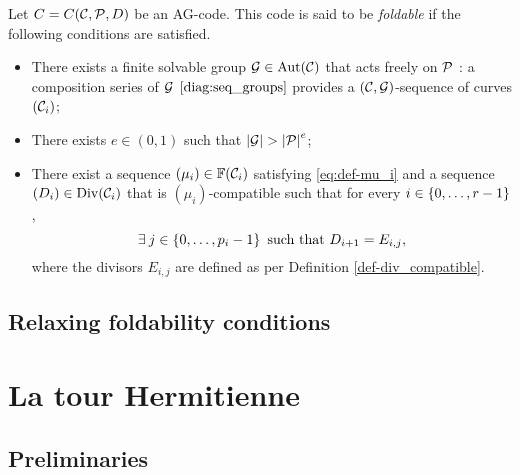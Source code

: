 \documentclass[10pt]{article}
\begin{document}
\begin{definition}\label{def:good_properties}
	Let $C =C(\mathcal{C},\mathcal{P},D)$ be an AG-code. This code is said to be \emph{foldable} if the following conditions are satisfied.
	\begin{itemize}
		\item There exists a finite solvable group $\mathcal{G} \in \operatorname{Aut}(\mathcal{C})$ that acts freely on $\mathcal{P}$ : a composition series of $\mathcal{G}$ $\eqref{diag:seq_groups}$ provides a $(\mathcal{C},\mathcal{G})$-sequence of curves $(\mathcal{C}_i)$;
		\item There exists $e \in (0,1)$ such that $\left|\mathcal{G}\right| > \left|\mathcal{P}\right|^e$;
		\item There exist a sequence $(\mu_i) \in \mathbb{F}(\mathcal{C}_i)$ satisfying \eqref{eq:def-mu_i} and a sequence $(D_i) \in \operatorname{Div}(\mathcal{C}_i)$ that is $(\mu_i)$-compatible such that for every $i \in \left\{0,\dots,r-1\right\}$,
		\begin{equation}\label{eq:cdt_Di+1}
			\exists \: j \in \left\{0,\dots,p_i-1\right\} \text{ such that } D_{i+1}=E_{i,j},
		\end{equation}
		where the divisors $E_{i, j}$ are defined as per Definition \ref{def-div_compatible}.
		
	\end{itemize}
\end{definition}

\subsection{Relaxing foldability conditions}



\section{La tour Hermitienne}

\subsection{Preliminaries}

 
\end{document}
